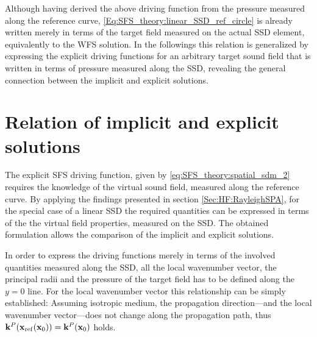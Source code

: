 Although having derived the above driving function from the pressure measured along the reference curve, \eqref{Eq:SFS_theory:linear_SSD_ref_circle} is already written merely in terms of the target field measured on the actual SSD element, equivalently to the WFS solution.
In the followings this relation is generalized by expressing the explicit driving functions for an arbitrary target sound field that is written in terms of pressure measured along the SSD, revealing the general connection between the implicit and explicit solutions.

\section{Relation of implicit and explicit solutions}

The explicit SFS driving function, given by \eqref{eq:SFS_theory:spatial_sdm_2} requires the knowledge of the virtual sound field, measured along the reference curve.
By applying the findings presented in section \ref{Sec:HF:RayleighSPA}, for the special case of a linear SSD the required quantities can be expressed in terms of the the virtual field properties, measured on the SSD. 
The obtained formulation allows the comparison of the implicit and explicit solutions.

In order to express the driving functions merely in terms of the involved quantities measured along the SSD, all the local wavenumber vector, the principal radii and the pressure of the target field has to be defined along the $y=0$ line.
For the local wavenumber vector this relationship can be simply established: Assuming isotropic medium, the propagation direction---and the local wavenumber vector---does not change along the propagation path, thus $\mathbf{k}^P(\mathbf{x}_{\mathrm{ref}}(\mathbf{x}_0)) = \mathbf{k}^P(\mathbf{x}_0)$ holds.

